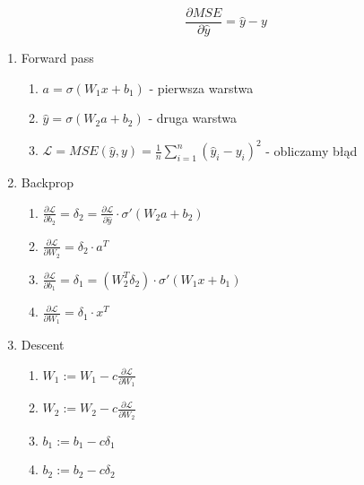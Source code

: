 \documentclass{../notatki}
\begin{document}
$$
\frac{\partial MSE}{\partial \hat{y}} = \hat{y} - y
$$

\begin{enumerate}
  \item Forward pass
    \begin{enumerate}
      \item $a = \sigma(W_1x + b_1)$ - pierwsza warstwa
      \item $\hat{y} = \sigma(W_2a + b_2)$ - druga warstwa
      \item $\mathcal{L} = MSE(\hat{y}, y) = \frac{1}{n} \sum_{i=1}^{n}
        (\hat{y}_i - y_i)^2$ - obliczamy błąd
    \end{enumerate}
  \item Backprop
    \begin{enumerate}
      \item $\frac{\partial \mathcal{L}}{\partial b_2} = \delta_2 =
        \frac{\partial \mathcal{L}}{\partial \hat{y}} \cdot
        \sigma'(W_2a + b_2)$
      \item $\frac{\partial \mathcal{L}}{\partial W_2} = \delta_2 \cdot a^T$
      \item $\frac{\partial \mathcal{L}}{\partial b_1} = \delta_1 =
        (W_2^T \delta_2) \cdot \sigma'(W_1x + b_1)$
      \item $\frac{\partial \mathcal{L}}{\partial W_1} = \delta_1 \cdot x^T$
    \end{enumerate}
  \item Descent
    \begin{enumerate}
      \item $W_1 := W_1 - c \frac{\partial \mathcal{L}}{\partial W_1}$
      \item $W_2 := W_2 - c \frac{\partial \mathcal{L}}{\partial W_2}$
      \item $b_1 := b_1 - c \delta_1$
      \item $b_2 := b_2 - c \delta_2$
    \end{enumerate}
\end{enumerate}
\end{document}

